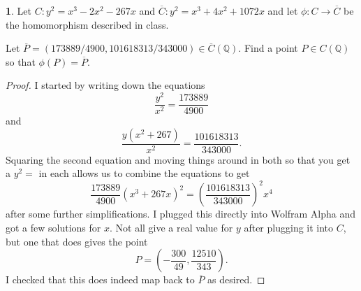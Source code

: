 \documentclass[12pt]{article}
\newcommand{\Q}{\mathbb{Q}}
\theoremstyle{definition}
\newtheorem{ex}{}
\begin{document}
\begin{ex}
	Let $C : y^{2} = x^{3} - 2x^{2} - 267x$ and
	$\overline{C} : y^{2} = x^{3} + 4x^{2} + 1072x$ and
	let $\phi : C \to \overline{C}$ be the homomorphism described in class.

	Let $\overline{P} = (173889/4900,101618313/343000) \in \overline{C}(\Q)$. Find a
	point $P \in C(\Q)$ so that $\phi(P) = \overline{P}$.
\end{ex}
\begin{proof}
	I started by writing down the equations \begin{equation*}
		\frac{y^2}{x^2} = \frac{173889}{4900}
	\end{equation*}
	and \begin{equation*}
		\frac{y(x^2+267)}{x^2} = \frac{101618313}{343000}.
	\end{equation*}
	Squaring the second equation and moving things around in both so that you get a $y^2 =$ in each allows us to combine the equations to get \begin{equation*}
		\frac{173889}{4900}(x^3+267x)^2 = \left( \frac{101618313}{343000} \right)^2 x^4
	\end{equation*}
	after some further simplifications.
	I plugged this directly into Wolfram Alpha and got a few solutions for $x$.
	Not all give a real value for $y$ after plugging it into $C$, but one that does gives the point \begin{equation*}
		P = \left( -\frac{300}{49}, \frac{12510}{343} \right).
	\end{equation*}
	I checked that this does indeed map back to $\overline{P}$ as desired.
\end{proof}
\end{document}

